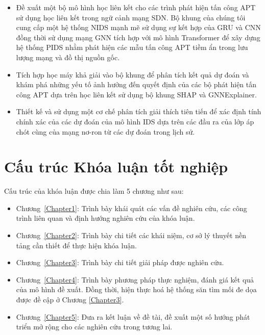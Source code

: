 
\begin{itemize}
    \item Đề xuất một bộ mô hình học liên kết cho các trình phát hiện tấn công APT sử dụng học liên kết trong ngữ cảnh mạng SDN. Bộ khung của chúng tôi cung cấp một hệ thống NIDS mạnh mẽ sử dụng sự kết hợp của GRU và CNN đồng thời sử dụng mạng GNN tích hợp với mô hình Transformer để xây dựng hệ thống PIDS nhằm phát hiện các mẫu tấn công APT tiềm ẩn trong lưu lượng mạng và đồ thị nguồn gốc.
    \item Tích hợp học máy khả giải vào bộ khung để phân tích kết quả dự đoán và khám phá những yếu tố ảnh hưởng đến quyết định của các bộ phát hiện tấn công APT dựa trên học liên kết sử dụng bộ khung SHAP và GNNExplainer.
    \item Thiết kế và sử dụng một cơ chế phân tích giải thích tiên tiến để xác định tính chính xác của các dự đoán của mô hình IDS dựa trên các đầu ra của lớp áp chót cùng của mạng nơ-ron từ các dự đoán trong lịch sử.
\end{itemize}


\section{Cấu trúc Khóa luận tốt nghiệp}

Cấu trúc của khóa luận được chia làm 5 chương như sau:

\begin{itemize}
    \item Chương~\ref{Chapter1}: \textbf{}
\newline
Trình bày khái quát các vấn đề nghiên cứu, các công trình liên quan và định hướng nghiên cứu của khóa luận. 
    \item Chương~\ref{Chapter2}: \textbf{}
\newline
Trình bày chi tiết các khái niệm, cơ sở lý thuyết nền tảng cần thiết để thực hiện khóa luận.
    \item Chương~\ref{Chapter3}: \textbf{}
\newline
Trình bày chi tiết giải pháp được nghiên cứu.
    \item Chương~\ref{Chapter4}: \textbf{}
\newline
Trình bày phương pháp thực nghiệm, đánh giá kết quả của mô hình đề xuất. Đồng thời, hiện thực hoá hệ thống săn tìm mối đe dọa được đề cập ở Chương \ref{Chapter3}.
    \item Chương~\ref{Chapter5}: \textbf{}
\newline
Đưa ra kết luận về đề tài, đề xuất một số hướng phát triển mở rộng cho các nghiên cứu trong tương lai. 
\end{itemize}

